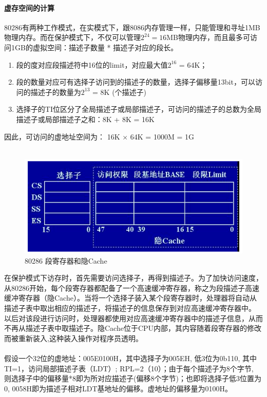 \documentclass[12pt]{article}
\begin{document}
\paragraph{虚存空间的计算} 80286有两种工作模式，在实模式下，跟8086内存管理一样，只能管理和寻址1MB物理内存。而在保护模式下，不仅可以管理$2^{24}=16$MB物理内存，而且最多可访问1GB的虚拟空间：描述子数量 * 描述子对应的段长。
\begin{enumerate}
\item 段的度对应段描述符中16位的limit，对应最大值$2^{16}$ = 64K；\\
\item 段的数量对应可有选择子访问到的描述子的数量，选择子偏移量13bit，可以访问的描述子的数量为$2^{13}$ = 8K (个描述子)\\
\item 选择子的TI位区分了全局描述子或局部描述子，可访问的描述子的总数为全局描述子或局部描述子之和：8K + 8K = 16K
\end{enumerate}
因此，可访问的虚地址空间为： 16K × 64K = 1000M = 1G \\\\
\begin{figure}[htbp]
\centering
\includegraphics[scale=0.7]{fig/19.png}
\caption{80286 段寄存器和隐Cache}
\label{fig:80286 Segment Registor and Cache}
\end{figure}
在保护模式下访存时，首先需要访问选择子，再得到描述子。为了加快访问速度，从80286开始，每个段寄存器都配备了一个高速缓冲寄存器，称之为段描述子高速缓冲寄存器（隐Cache）。当将一个选择子装入某个段寄存器时，处理器将自动从描述子表中取出相应的描述子，将描述子的信息保存到对应高速缓冲寄存器中。 以后对该段进行访问时，处理器都使用对应高速缓冲寄存器中的描述子信息，从而不再从描述子表中取描述子。隐Cache位于CPU内部，其内容随着段寄存器的修改而被重新装入,这种装入操作对程序员透明。\\\\
假设一个32位的虚地址：005E0100H，其中选择子为005EH, 低3位为0b110, 其中TI=1，访问局部描述子表（LDT）; RPL=2（10）；由于每个描述子为8个字节, 则选择子中的偏移量*8即为所对应描述子(偏移8个字节)；也即将选择子低3位置为0, 0058H即为描述子相对LDT基地址的偏移。虚地址的偏移量为0100H。
\end{document}
